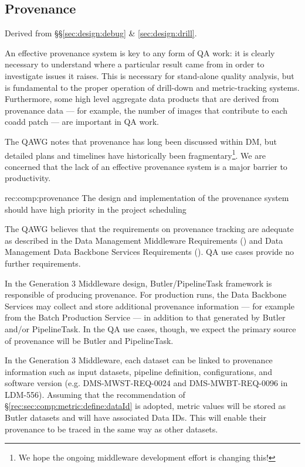 \subsection{Provenance}
\label{sec:comp:provenance}

Derived from \S\S\ref{sec:design:debug} \& \ref{sec:design:drill}.

An effective provenance system is key to any form of QA work: it is clearly necessary to understand where a particular result came from in order to investigate issues it raises.
This is necessary for stand-alone quality analysis, but is fundamental to the proper operation of drill-down and metric-tracking systems.
Furthermore, some high level aggregate data products that are derived from provenance data --- for example, the number of images that contribute to each coadd patch --- are important in QA work.

The QAWG notes that provenance has long been discussed within DM, but detailed plans and timelines have historically been fragmentary\footnote{We hope the ongoing middleware development effort is changing this!}.
We are concerned that the lack of an effective provenance system is a major barrier to productivity.

\begin{recommendation}
  {rec:comp:provenance}
  {The design and implementation of the provenance system should have high priority in the project scheduling}
\end{recommendation}

The QAWG believes that the requirements on provenance tracking are adequate as described in the Data Management Middleware Requirements () and Data Management Data Backbone Services Requirements ().
QA use cases provide no further requirements.

In the Generation 3 Middleware design, Butler/PipelineTask framework is responsible of producing provenance.
For production runs, the Data Backbone Services may collect and store additional provenance information --- for example from the Batch Production Service --- in addition to that generated by Butler and/or PipelineTask.
In the QA use cases, though, we expect the primary source of provenance will be Butler and PipelineTask.

In the Generation 3 Middleware, each dataset can be linked to provenance information such as input datasets, pipeline definition, configurations, and software version (e.g. DMS-MWST-REQ-0024 and DMS-MWBT-REQ-0096 in LDM-556).
Assuming that the recommendation of \S\ref{rec:sec:comp:metric:define:dataId} is adopted, \glspl{metric value} will be stored as Butler datasets and will have associated Data IDs.
This will enable their provenance to be traced in the same way as other datasets.

